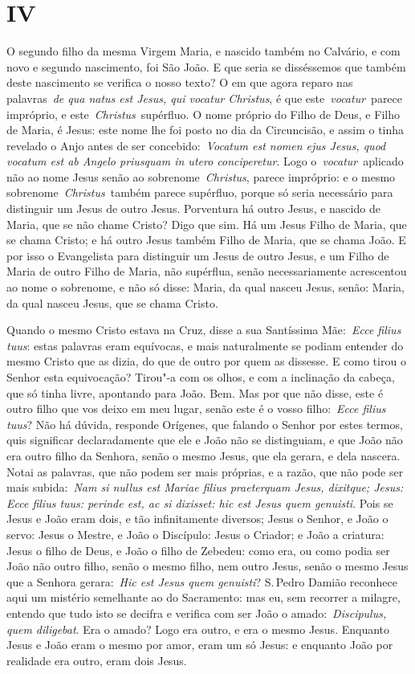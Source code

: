 \section*{IV}

O segundo filho da mesma Virgem Maria, e nascido também no
Calvário, e com novo e segundo nascimento, foi São João. E que seria se
disséssemos que também deste nascimento se verifica o nosso texto? O em
que agora reparo nas palavras~\emph{de qua natus est Jesus, qui vocatur
Christus}, é que este~\emph{vocatur}~parece impróprio, e
este~\emph{Christus}~supérfluo. O nome próprio do Filho de Deus, e Filho
de Maria, é Jesus: este nome lhe foi posto no dia da Circuncisão, e
assim o tinha revelado o Anjo antes de ser concebido:~\emph{Vocatum est
nomen ejus Jesus, quod vocatum est ab Angelo priusquam in utero
conciperetur}. Logo o~\emph{vocatur}~aplicado não ao
nome Jesus senão ao sobrenome~\emph{Christus}, parece impróprio: e o
mesmo sobrenome~\emph{Christus}~também parece supérfluo, porque só seria
necessário para distinguir um Jesus de outro Jesus. Porventura há outro
Jesus, e nascido de Maria, que se não chame Cristo? Digo que sim. Há um
Jesus Filho de Maria, que se chama Cristo; e há outro Jesus também Filho
de Maria, que se chama João. E por isso o Evangelista para distinguir um
Jesus de outro Jesus, e um Filho de Maria de outro Filho de Maria, não
supérflua, senão necessariamente acrescentou ao nome o sobrenome, e não
só disse: Maria, da qual nasceu Jesus, senão: Maria, da qual nasceu
Jesus, que se chama Cristo.


Quando o mesmo Cristo estava na Cruz, disse a sua Santíssima
Mãe:~\emph{Ecce filius tuus}: estas palavras eram
equívocas, e mais naturalmente se podiam entender do mesmo Cristo que as
dizia, do que de outro por quem as dissesse. E como tirou o Senhor esta
equivocação? Tirou"-a com os olhos, e com a inclinação da cabeça, que só
tinha livre, apontando para João. Bem. Mas por que não disse, este é
outro filho que vos deixo em meu lugar, senão este é o vosso
filho:~\emph{Ecce filius tuus}? Não há dúvida, responde Orígenes, que
falando o Senhor por estes termos, quis significar declaradamente que
ele e João não se distinguiam, e que João não era outro filho da
Senhora, senão o mesmo Jesus, que ela gerara, e dela nascera. Notai as
palavras, que não podem ser mais próprias, e a razão, que não pode ser
mais subida:~\emph{Nam si nullus est Mariae filius praeterquam Jesus,
dixitque; Jesus: Ecce filius tuus: perinde est, ac si dixisset: hic est
Jesus quem genuisti}. Pois se Jesus e João eram dois,
e tão infinitamente diversos; Jesus o Senhor, e João o servo: Jesus o
Mestre, e João o Discípulo: Jesus o Criador; e João a criatura: Jesus o
filho de Deus, e João o filho de Zebedeu: como era, ou como podia ser
João não outro filho, senão o mesmo filho, nem outro Jesus, senão o
mesmo Jesus que a Senhora gerara:~\emph{Hic est Jesus quem genuisti}? S.\,Pedro Damião reconhece aqui um mistério semelhante ao do Sacramento: mas
eu, sem recorrer a milagre, entendo que tudo isto se decifra e verifica
com ser João o amado:~\emph{Discipulus, quem
diligebat}. Era o amado? Logo era outro, e era o mesmo
Jesus. Enquanto Jesus e João eram o mesmo por amor, eram um só Jesus: e
enquanto João por realidade era outro, eram dois Jesus.


